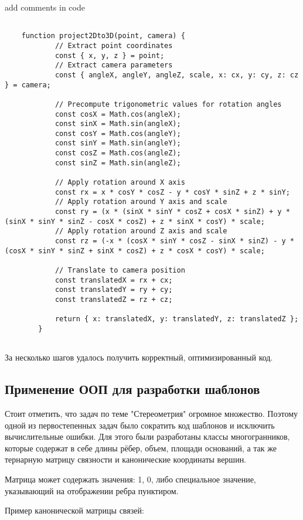 \begin{leftBox}
	add comments in code
\end{leftBox}

\begin{lstlisting}
	
	function project2Dto3D(point, camera) {
			// Extract point coordinates
			const { x, y, z } = point;
			// Extract camera parameters
			const { angleX, angleY, angleZ, scale, x: cx, y: cy, z: cz } = camera;

			// Precompute trigonometric values for rotation angles
			const cosX = Math.cos(angleX);
			const sinX = Math.sin(angleX);
			const cosY = Math.cos(angleY);
			const sinY = Math.sin(angleY);
			const cosZ = Math.cos(angleZ);
			const sinZ = Math.sin(angleZ);

			// Apply rotation around X axis
			const rx = x * cosY * cosZ - y * cosY * sinZ + z * sinY;
			// Apply rotation around Y axis and scale
			const ry = (x * (sinX * sinY * cosZ + cosX * sinZ) + y * (sinX * sinY * sinZ - cosX * cosZ) + z * sinX * cosY) * scale;
			// Apply rotation around Z axis and scale
			const rz = (-x * (cosX * sinY * cosZ - sinX * sinZ) - y * (cosX * sinY * sinZ + sinX * cosZ) + z * cosX * cosY) * scale;

			// Translate to camera position
			const translatedX = rx + cx;
			const translatedY = ry + cy;
			const translatedZ = rz + cz;

			return { x: translatedX, y: translatedY, z: translatedZ };
		}
	
\end{lstlisting}

За несколько шагов удалось получить корректный, оптимизированный код.

\subsection{Применение ООП для разработки шаблонов}

Стоит отметить, что задач по теме "Стереометрия" огромное множество. Поэтому одной из первостепенных задач было сократить код шаблонов и исключить вычислительные ошибки. Для этого были разработаны классы многогранников, которые содержат в себе длины рёбер, объем, площади оснований, а так же тернарную матрицу связности и канонические координаты вершин.

Матрица может содержать значения: 1, 0, либо специальное значение, указывающий на отображении ребра пунктиром.

Пример канонической матрицы связей:

